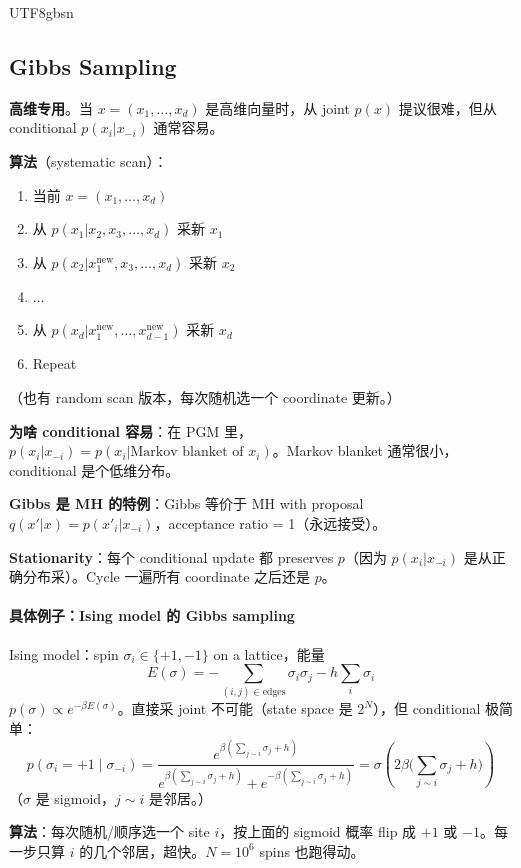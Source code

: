 \documentclass[11pt]{article}
\begin{document}
\begin{CJK}{UTF8}{gbsn}
\subsection{Gibbs Sampling}

\textbf{高维专用}。当 $x = (x_1, \ldots, x_d)$ 是高维向量时，从 joint $p(x)$ 提议很难，但从 conditional $p(x_i | x_{-i})$ 通常容易。

\textbf{算法}（systematic scan）：
\begin{enumerate}[nosep]
  \item 当前 $x = (x_1, \ldots, x_d)$
  \item 从 $p(x_1 | x_2, x_3, \ldots, x_d)$ 采新 $x_1$
  \item 从 $p(x_2 | x_1^{\text{new}}, x_3, \ldots, x_d)$ 采新 $x_2$
  \item $\ldots$
  \item 从 $p(x_d | x_1^{\text{new}}, \ldots, x_{d-1}^{\text{new}})$ 采新 $x_d$
  \item Repeat
\end{enumerate}
（也有 random scan 版本，每次随机选一个 coordinate 更新。）

\textbf{为啥 conditional 容易}：在 PGM 里，$p(x_i | x_{-i}) = p(x_i | \text{Markov blanket of } x_i)$。Markov blanket 通常很小，conditional 是个低维分布。

\textbf{Gibbs 是 MH 的特例}：Gibbs 等价于 MH with proposal $q(x'|x) = p(x'_i | x_{-i})$，acceptance ratio = 1（永远接受）。

\textbf{Stationarity}：每个 conditional update 都 preserves $p$（因为 $p(x_i | x_{-i})$ 是从正确分布采）。Cycle 一遍所有 coordinate 之后还是 $p$。

\paragraph{具体例子：Ising model 的 Gibbs sampling}

Ising model：spin $\sigma_i \in \{+1, -1\}$ on a lattice，能量
\[
E(\sigma) = -\sum_{(i,j) \in \text{edges}} \sigma_i \sigma_j - h \sum_i \sigma_i
\]
$p(\sigma) \propto e^{-\beta E(\sigma)}$。直接采 joint 不可能（state space 是 $2^N$），但 conditional 极简单：
\[
p(\sigma_i = +1 \mid \sigma_{-i}) = \frac{e^{\beta(\sum_{j \sim i} \sigma_j + h)}}{e^{\beta(\sum_{j \sim i} \sigma_j + h)} + e^{-\beta(\sum_{j \sim i} \sigma_j + h)}} = \sigma\!\left(2\beta\Big(\sum_{j \sim i} \sigma_j + h\Big)\right)
\]
（$\sigma$ 是 sigmoid，$j \sim i$ 是邻居。）

\textbf{算法}：每次随机/顺序选一个 site $i$，按上面的 sigmoid 概率 flip 成 $+1$ 或 $-1$。每一步只算 $i$ 的几个邻居，超快。$N = 10^6$ spins 也跑得动。


\end{CJK}
\end{document}
